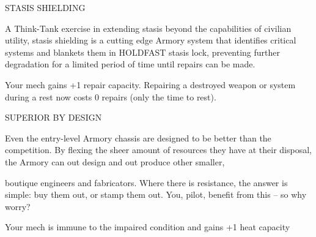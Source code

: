 STASIS SHIELDING  

A Think-Tank exercise in extending stasis beyond the capabilities of civilian utility, stasis shielding is a  
cutting edge Armory system that identifies critical systems and blankets them in HOLDFAST stasis lock,  
preventing further degradation for a limited period of time until repairs can be made.   

Your mech gains +1 repair capacity. Repairing a destroyed weapon or system during a rest now  
costs 0 repairs (only the time to rest).
 

                                                                                                                 


SUPERIOR BY DESIGN  

Even the entry-level Armory chassis are designed to be better than the competition. By flexing the sheer  
amount of resources they have at their disposal, the Armory can out design and out produce other smaller,  

boutique engineers and fabricators. Where there is resistance, the answer is simple: buy them out, or  
stamp them out. You, pilot, benefit from this -- so why worry?   

Your mech is immune to the impaired condition and gains +1 heat capacity
 